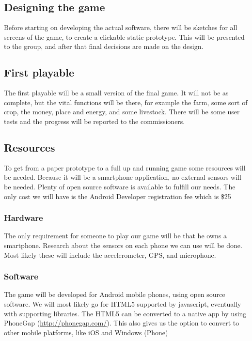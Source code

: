 \documentclass[a4paper,11pt,notitlepage]{report}
\begin{document}
\subsection{Designing the game}
Before starting on developing the actual software, there will be sketches for all screens of the game, to create a clickable static prototype. This will be presented to the group, and after that final decisions are made on the design.

\subsection{First playable}
The first playable will be a small version of the final game. It will not be as complete, but the vital functions will be there, for example the farm, some sort of crop, the money, place and energy, and some livestock. There will be some user tests and the progress will be reported to the commissioners.

\subsection{Resources}
To get from a paper prototype to a full up and running game some resources will be needed. Because it will be a smartphone application, no external sensors will be needed. Plenty of open source software is available to fulfill our needs. The only cost we will have is the Android Developer registration fee which is \$25
\subsubsection{Hardware}
The only requirement for someone to play our game will be that he owns a smartphone. Research about the sensors on each phone we can use will be done. Most likely these will include the accelerometer, GPS, and microphone.
\subsubsection{Software}
The game will be developed for Android mobile phones, using open source software. 
We will most likely go for HTML5 supported by javascript, eventually with supporting libraries. The HTML5 can be converted to a native app by using PhoneGap (\url{http://phonegap.com/}). This also gives us the option to convert to other mobile platforms, like iOS and Windows (Phone)


%
%
\end{document}
